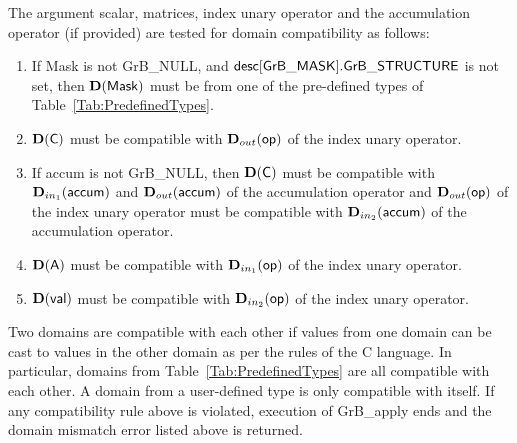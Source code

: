 {\color{red}
The argument scalar, matrices, index unary operator and the accumulation 
operator (if provided) are tested for domain compatibility as follows:
\begin{enumerate}
    \item If {\sf Mask} is not {\sf GrB\_NULL}, and ${\sf desc[GrB\_MASK].GrB\_STRUCTURE}$
    is not set, then $\bold{D}({\sf Mask})$ must be from one of the pre-defined types of 
    Table~\ref{Tab:PredefinedTypes}.

    \item $\bold{D}({\sf C})$ must be
    compatible with $\mbox{$\mathbf{D}_{out}$}({\sf op})$ of the index unary operator. 

    \item If {\sf accum} is not {\sf GrB\_NULL}, then $\bold{D}({\sf C})$ must be
    compatible with $\mbox{$\mathbf{D}_{in_{1}}$}({\sf accum})$ and $\mbox{$\mathbf{D}_{out}$}({\sf accum})$ of the accumulation operator and 
    $\mbox{$\mathbf{D}_{out}$}({\sf op})$ of the index unary operator must be compatible with $\mbox{$\mathbf{D}_{in_{2}}$}({\sf accum})$ of the accumulation operator.

    \item $\bold{D}({\sf A})$ must be compatible with $\mbox{$\mathbf{D}_{in_{1}}$}({\sf op})$ of the index unary operator.
    
    \item $\bold{D}({\sf val})$ must be compatible with $\mbox{$\mathbf{D}_{in_{2}}$}({\sf op})$ of the index unary operator.
\end{enumerate}
}
Two domains are compatible with each other if values from one domain can be cast 
to values in the other domain as per the rules of the C language.
In particular, domains from Table~\ref{Tab:PredefinedTypes} are all compatible 
with each other. A domain from a user-defined type is only compatible with itself.
If any compatibility rule above is violated, execution of {\sf GrB\_apply} ends and 
the domain mismatch error listed above is returned.

